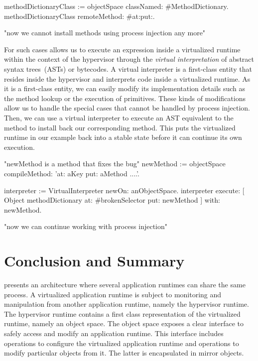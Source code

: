 \begin{code}
methodDictionaryClass := objectSpace classNamed: #MethodDictionary.
methodDictionaryClass remoteMethod: #at:put:.

"now we cannot install methods using process injection any more"
\end{code}

For such cases \Vtt allows us to execute an expression inside a virtualized runtime within the context of the hypervisor through the \emph{virtual interpretation} of \eg abstract syntax trees~(ASTs) or bytecodes. A virtual interpreter is a first-class entity that resides inside the hypervisor and interprets code inside a virtualized runtime. As it is a first-class entity, we can easily modify its implementation details such as the method lookup or the execution of primitives. These kinds of modifications allow us to handle the special cases that cannot be handled by process injection. Then, we can use a virtual interpreter to execute an AST equivalent to the  method to install back our corresponding method. This puts the virtualized runtime in our example back into a stable state before it can continue its own execution.

\begin{code}
"newMethod is a method that fixes the bug"
newMethod := objectSpace compileMethod: 'at: aKey put: aMethod ....'.

interpreter := VirtualInterpreter newOn: anObjectSpace.
interpreter
	execute: [ Object methodDictionary at: #brokenSelector put: newMethod ]
	with: newMethod.
	
"now we can continue working with process injection"
\end{code}

\section{Conclusion and Summary}

\Vtt presents an architecture where several application runtimes can share the same process. A virtualized application runtime is subject to monitoring and manipulation from another application runtime, namely the hypervisor runtime. The hypervisor runtime contains a first class representation of the virtualized runtime, namely an object space. The object space exposes a clear interface to safely access and modify an application runtime. This interface includes operations to configure the virtualized application runtime and operations to modify particular objects from it. The latter is encapsulated in mirror objects.

